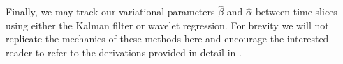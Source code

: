 Finally, we may track our variational parameters $\hat{\beta}$ and $\hat{\alpha}$  between time slices using either the Kalman filter or wavelet regression. For brevity we will not replicate the mechanics of these methods here and encourage the interested reader to refer to the derivations provided in detail in  \parencite{Blei:2006:DTM:1143844.1143859}.





































